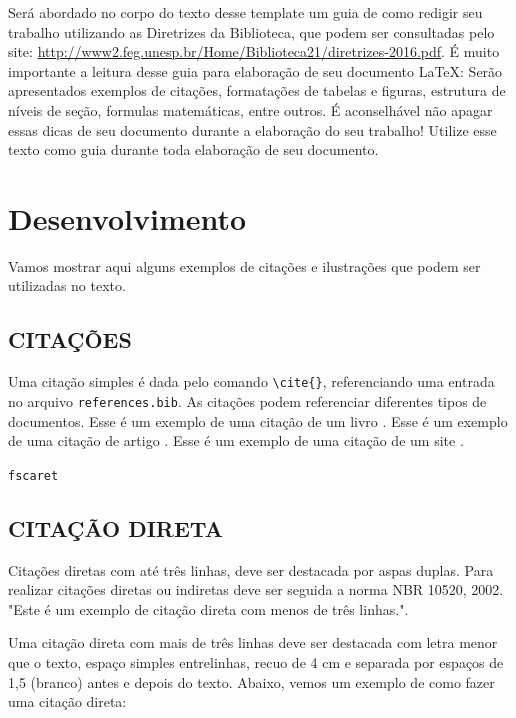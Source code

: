 \documentclass[
  12pt,		%
  a4paper,	%
  openright,%
  oneside,	%
  chapter=TITLE,		%
  section=TITLE,		%
  english,	%
  french,	%
  spanish,	%
  brazil
]{abntex2}
\begin{document}
    Será abordado no corpo do texto desse template um guia de como redigir seu trabalho utilizando as Diretrizes da Biblioteca, que podem ser consultadas pelo site: \url{http://www2.feg.unesp.br/Home/Biblioteca21/diretrizes-2016.pdf}. É muito importante a leitura desse guia para elaboração de seu documento \LaTeX: Serão apresentados exemplos de citações, formatações de tabelas e figuras, estrutura de níveis de seção, formulas matemáticas, entre outros. É aconselhável não apagar essas dicas de seu documento durante a elaboração do seu trabalho! Utilize esse texto como guia durante toda elaboração de seu documento.
    
    \chapter{Desenvolvimento}
    
        Vamos mostrar aqui alguns exemplos de citações e ilustrações que podem ser utilizadas no texto.
        
        \section{CITAÇÕES}
        
            Uma citação \cite{carbono} simples é dada pelo comando \verb|\cite{}|, referenciando uma entrada no arquivo \verb|references.bib|. As citações podem referenciar diferentes tipos de documentos. Esse é um exemplo de uma citação de um livro \cite{livro}. Esse é um exemplo de uma citação de artigo \cite{artigo}. Esse é um exemplo de uma citação de um site \cite{website}.
            
            \verb|fscaret| \cite{fscaret}
        
        \section{CITAÇÃO DIRETA}
        
            Citações diretas com até três linhas, deve ser destacada por aspas duplas. Para realizar citações diretas ou indiretas deve ser seguida a norma NBR 10520, 2002. "Este é um exemplo de citação direta com menos de três linhas."\cite{artigo}.
    
             Uma citação direta com mais de três linhas deve ser destacada com letra menor que o texto, espaço simples entrelinhas, recuo de 4 cm e separada por espaços de 1,5 (branco) antes e depois do texto. Abaixo, vemos um exemplo de como fazer uma citação direta:
            
\end{document}
